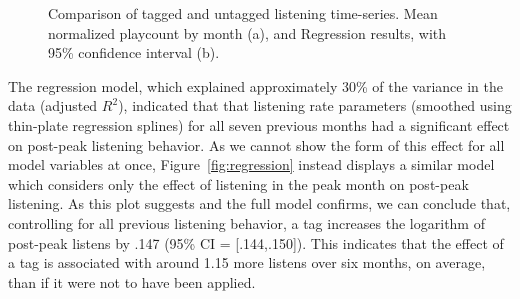   \begin{figure}[t]
    \hfill
    \caption{Comparison of tagged and untagged listening time-series. Mean normalized playcount by month (a), and Regression results, with 95\% confidence interval (b).}
    \label{fig:regressionFigs}
    \vspace{-2em}
  \end{figure}

The regression model, which explained approximately 30\% of the variance in the data (adjusted $R^{2}$), indicated that that listening rate parameters (smoothed using thin-plate regression splines) for all seven previous months had a significant effect on post-peak listening behavior. As we cannot show the form of this effect for all model variables at once, Figure~\ref{fig:regression} instead displays a similar model which considers only the effect of listening in the peak month on post-peak listening. As this plot suggests and the full model confirms, we can conclude that, controlling for all previous listening behavior, a tag increases the logarithm of post-peak listens by .147 (95\% CI = [.144,.150]). This indicates that the effect of a tag is associated with around 1.15 more listens over six months, on average, than if it were not to have been applied.   

